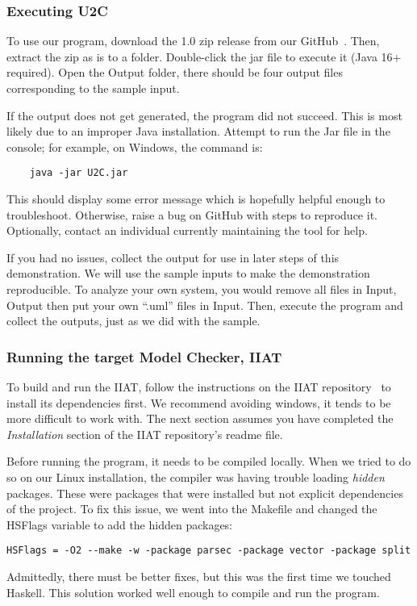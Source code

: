 \newpage
\subsubsection{Executing U2C}\label{subsubsec:exec}
To use our program, download the 1.0 zip release from our GitHub~\cite{repo_u2c}.
Then, extract the zip as is to a folder.
Double-click the jar file to execute it (Java 16+ required).
Open the Output folder, there should be four output files corresponding to the sample input.

If the output does not get generated, the program did not succeed.
This is most likely due to an improper Java installation.
Attempt to run the Jar file in the console; for example, on Windows, the command is:
\begin{verbatim}
    java -jar U2C.jar
\end{verbatim}
This should display some error message which is hopefully helpful enough to troubleshoot.
Otherwise, raise a bug on GitHub with steps to reproduce it.
Optionally, contact an individual currently maintaining the tool for help.

If you had no issues, collect the output for use in later steps of this demonstration.
We will use the sample inputs to make the demonstration reproducible.
To analyze your own system, you would remove all files in Input, Output then put your own ``.uml'' files in Input.
Then, execute the program and collect the outputs, just as we did with the sample.

\subsubsection{Running the target Model Checker, IIAT}\label{subsubsec:iiat-run}
To build and run the IIAT, follow the instructions on the IIAT repository~\cite{repo_iiat} to install its dependencies first.
We recommend avoiding windows, it tends to be more difficult to work with.
The next section assumes you have completed the \textit{Installation} section of the IIAT repository's readme file.

Before running the program, it needs to be compiled locally.
When we tried to do so on our Linux installation, the compiler was having trouble loading \textit{hidden} packages.
These were packages that were installed but not explicit dependencies of the project.
To fix this issue, we went into the Makefile and changed the HSFlags variable to add the hidden packages:
\begin{verbatim}HSFlags = -O2 --make -w -package parsec -package vector -package split\end{verbatim}
Admittedly, there must be better fixes, but this was the first time we touched Haskell.
This solution worked well enough to compile and run the program.

